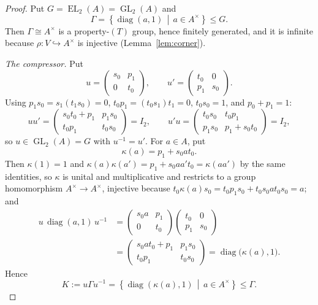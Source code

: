 \documentclass[11pt]{amsart}
\theoremstyle{definition}
\theoremstyle{plain}
\newcommand{\GL}{\operatorname{GL}}
\newcommand{\EL}{\operatorname{EL}}
\newcommand{\into}{\hookrightarrow}
\newcommand{\set}[1]{\left\{#1\right\}}
\newcommand{\suchthat}{\,\middle|\,}
\DeclareMathOperator{\diag}{diag}
\begin{document}
\begin{proof}
Put \(G=\EL_2(A)=\GL_2(A)\) and
\[
 \Gamma=\set{\diag(a,1)\suchthat a\in A^\times}\leq G .
\]
Then \(\Gamma\cong A^\times\) is a property-\((T)\) group, hence finitely generated, and it is infinite because \(\rho:V\into A^\times\) is injective (Lemma~\ref{lem:corner}).

\emph{The compressor.}  Put
\[
 u=\begin{pmatrix}s_0&p_1\\ 0&t_0\end{pmatrix},
 \qquad
 u'=\begin{pmatrix}t_0&0\\ p_1&s_0\end{pmatrix}.
\]
Using \(p_1s_0=s_1(t_1s_0)=0\), \(t_0p_1=(t_0s_1)t_1=0\), \(t_0s_0=1\), and \(p_0+p_1=1\):
\[
 uu'=\begin{pmatrix}s_0t_0+p_1&p_1s_0\\ t_0p_1&t_0s_0\end{pmatrix}=I_2,
 \qquad
 u'u=\begin{pmatrix}t_0s_0&t_0p_1\\ p_1s_0&p_1+s_0t_0\end{pmatrix}=I_2,
\]
so \(u\in\GL_2(A)=G\) with \(u^{-1}=u'\).  For \(a\in A\), put
\[
 \kappa(a)=p_1+s_0at_0 .
\]
Then \(\kappa(1)=1\) and \(\kappa(a)\kappa(a')=p_1+s_0aa't_0=\kappa(aa')\) by the same identities, so \(\kappa\) is unital and multiplicative and restricts to a group homomorphism \(A^\times\to A^\times\), injective because \(t_0\kappa(a)s_0=t_0p_1s_0+t_0s_0at_0s_0=a\); and
\begin{align*}
 u\,\diag(a,1)\,u^{-1}
 &=\begin{pmatrix}s_0a&p_1\\ 0&t_0\end{pmatrix}
 \begin{pmatrix}t_0&0\\ p_1&s_0\end{pmatrix}\\
 &=\begin{pmatrix}s_0at_0+p_1&p_1s_0\\ t_0p_1&t_0s_0\end{pmatrix}
 =\diag\bigl(\kappa(a),1\bigr).
\end{align*}
Hence
\[
 K:=u\Gamma u^{-1}=\set{\diag(\kappa(a),1)\suchthat a\in A^\times}\leq\Gamma .
\]


\end{proof}
\end{document}
